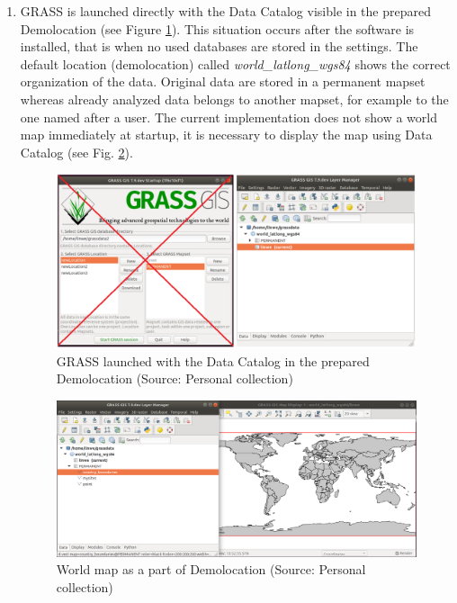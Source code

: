 \documentclass[a4paper,10pt,twoside]{article}
\begin{document}
\begin{enumerate}

\item GRASS is launched directly with the Data Catalog visible in the prepared Demolocation (see Figure \ref{fig:demolocation_startup}). This situation occurs after the software is installed, that is when no used databases are stored in the settings. The default location (demolocation) called \textit{world\_latlong\_wgs84} shows the correct organization of the data. Original data are stored in a permanent mapset whereas already analyzed data belongs to another mapset, for example to the one named after a user. The current implementation does not show a world map immediately at startup, it is necessary to display the map using Data Catalog (see Fig. \ref{fig:demolocation}).

\begin{figure}[hbt!] 
\begin{center}
\includegraphics[width=17cm]{../pictures/demolocation_startup.png} 
\caption[GRASS launched with the Data Catalog in the prepared Demolocation]{GRASS launched with the Data Catalog in the prepared Demolocation (Source: Personal collection)}
\label{fig:demolocation_startup}
\end{center}
\end{figure}

\begin{figure}[hbt!] 
\begin{center}
\includegraphics[width=16.5cm]{../pictures/demolocation.png} 
\caption[World map as a part of Demolocation]{World map as a part of Demolocation (Source: Personal collection)}
\label{fig:demolocation}
\end{center}
\end{figure}


\end{enumerate}
\end{document}
